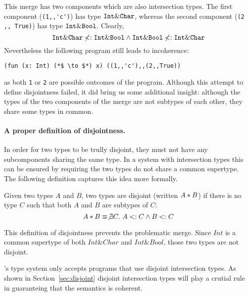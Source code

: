 \noindent This merge has two components which are also intersection
types. The first component (\lstinline{(1,,'c')}) has type $\texttt{Int} \&
\texttt{Char}$, whereas the second component (\lstinline{(2 ,, True)}) has type
$\texttt{Int} \& \texttt{Bool}$. Clearly,
\[ \texttt{Int} \& \texttt{Char} \not <: \texttt{Int} \& \texttt{Bool} \wedge \texttt{Int} \& \texttt{Bool} \not <: \texttt{Int} \& \texttt{Char} \]
Nevertheless the following program still leads to
incoherence:
\begin{lstlisting}
(fun (x: Int) (*$ \to $*) x) ((1,,'c'),,(2,,True))
\end{lstlisting}
as both \lstinline{1} or \lstinline{2} are possible outcomes
of the program. Although this attempt to define disjointness failed,
it did bring us some additional insight: although the types of the two
components of the merge are not subtypes of each other, they share
some types in common.

\paragraph{A proper definition of disjointness.} In order for two types
to be trully disjoint, they must not have any subcomponents sharing
the same type. In a system with intersection types this can be ensured
by requiring the two types do not share a common supertype. The
following definition captures this idea more formally.

\begin{definition}[Disjointness]
  Given two types $A$ and $B$, two types are disjoint
  (written $A * B$) if there is no type $C$ such that both $A$ and $B$ are
  subtypes of $C$:
  \[A * B \equiv \not\exists C.~A <: C \wedge B <: C\]
\end{definition}

\noindent This definition of disjointness prevents the problematic
merge. Since $Int$ is a common supertype of both $Int \& Char$ and
$Int \& Bool$, those two types are not disjoint.

\namedis's type system only accepts programs that use disjoint
intersection types. As shown in Section~\ref{sec:disjoint} disjoint intersection
types will play a crutial rule in guaranteing that the semantics is coherent.

